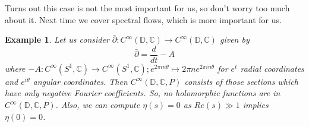 \documentclass[11pt]{article}
\newcommand{\C}{\mathbb{C}}
\newtheorem{eg}[thm]{Example}
\begin{document}
 Turns out this case is not the most important for us, so don't worry too much about it. Next time we cover spectral flows, which is more important for us.


\begin{eg}
Let us consider $\bar{\partial}: C^\infty (\mathbb{D}, \C) \to C^\infty (\mathbb{D}, \C)$ given by $$\bar{\partial} = \frac{d}{dt} - A$$ where $-A: C^\infty(S^1, \C) \to  C^\infty(S^1, \C); e^{2\pi i n\theta} \mapsto 2 \pi n e^{2\pi i n\theta}$  for $e^t$ radial coordinates and $e^{i\theta}$ angular coordinates.
Then  $C^\infty (\mathbb{D}, \C, P)$ consists of those sections which have only negative Fourier coefficients. So, no holomorphic functions are in $C^\infty (\mathbb{D}, \C, P)$. Also, we can compute $\eta(s) = 0$ as $Re(s) \gg 1$ implies $\eta(0) = 0$.

\end{eg}
\end{document}
